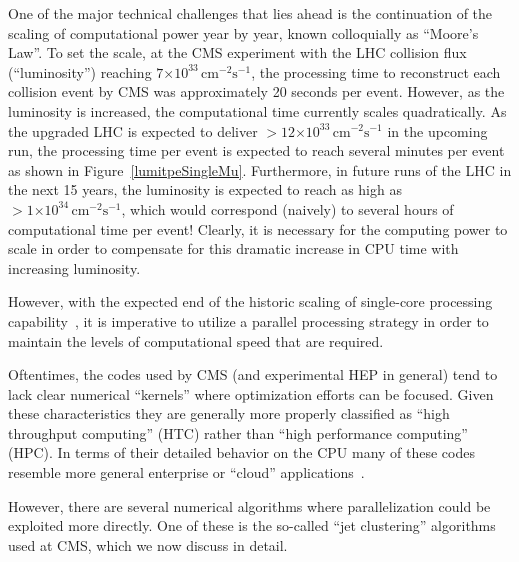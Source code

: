 \documentclass[12pt]{article}
\newcommand{\instlumiA}     {\ensuremath{\times 10^{33} \,\mathrm{cm}^{-2} \mathrm{s}^{-1}}}
\newcommand{\instlumiB}     {\ensuremath{\times 10^{34} \,\mathrm{cm}^{-2} \mathrm{s}^{-1}}}
\begin{document}
One of the major technical challenges that lies ahead is the
continuation of the scaling of computational power year by year, known
colloquially as ``Moore's Law''. 
To set the scale, at the CMS experiment
with the LHC collision flux (``luminosity'') reaching
$7\instlumiA$, the processing
time to reconstruct each collision event by CMS was approximately 20
seconds per event. However, as the luminosity is
increased, the computational time currently scales quadratically. As
the upgraded LHC is expected to deliver $>12\instlumiA$ in the
upcoming run, the processing time per event is expected to reach
several minutes per event as shown in
Figure~\ref{lumitpeSingleMu}. Furthermore, in future runs of the LHC
in the next 15 years, the luminosity is expected to reach as high as
$>1\instlumiB$, which would correspond (naively) to several hours of
computational time per event! Clearly, it is necessary for the
computing power to scale in order to compensate for this dramatic
increase in CPU time with increasing luminosity. 



However, with the expected end of the historic scaling of single-core
processing capability~\cite{GAMEOVER}, it is imperative to utilize a
parallel processing
strategy in order to maintain the levels of computational speed that
are required.

Oftentimes,
the codes used by CMS (and experimental HEP in general) tend to lack
clear numerical ``kernels'' where optimization efforts can be focused. 
Given these characteristics they are generally more properly classified as
``high throughput computing'' (HTC) rather than ``high performance computing'' (HPC). 
In terms of their detailed behavior on the CPU many of these codes resemble
more general enterprise or ``cloud''
applications~\cite{CLOUDSUITE,GOODACHEP}.

However, there are several numerical algorithms where parallelization
could be exploited more directly. One of these is the so-called ``jet
clustering'' algorithms used at CMS, which we now discuss in detail. 

 
\end{document}
